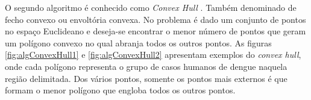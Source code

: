 O segundo algoritmo é conhecido como {\em Convex Hull} \cite{ConvexHull}. Também denominado de fecho convexo ou envoltória convexa. No problema é dado um conjunto de pontos no espaço Euclideano e deseja-se encontrar o menor número de pontos que geram um polígono convexo no qual abranja todos os outros pontos.
As figuras \ref{fig:algConvexHull1} e \ref{fig:algConvexHull2} apresentam exemplos do \emph{convex hull}, onde cada polígono representa o grupo de casos humanos de dengue naquela região delimitada. Dos vários pontos, somente os pontos mais externos é que formam o menor polígono que engloba todos os outros pontos.
%
\begin{figure}[!ht]
	\centering	
\end{figure}
\FloatBarrier
\begin{figure}[!ht]
	\centering	
\end{figure}
\FloatBarrier
